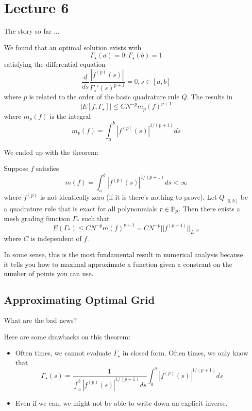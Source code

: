 \documentclass{article}
\begin{document}
\newpage
\section{Lecture 6}

The story so far ...


We found that an optimal solution exists with
\[\Gamma_\star(a) = 0; \Gamma_\star(b) = 1\]
satisfying the differential equation
\[\frac{d}{ds} \frac{|f^{(p)}(s)|}{\Gamma_\star'(s)^{p+1}} = 0, s \in [a, b]\]
where $p$ is related to the order of the basic quadrature rule $Q$. The results in
\[ | E[f, \Gamma_\star] | \leq C N^{-p} m_p(f)^{p+1}\]
where $m_p(f)$ is the integral
\[m_p(f) = \int_a^b |f^{(p)}(s)|^{1/(p+1)} ds\]

We ended up with the theorem:
\begin{theorem}
    Suppose $f$ satisfies
    \[m(f) = \int_a^b |f^{(p)}(s)|^{1/(p+1)} ds < \infty\]
    where $f^{(p)}$ is not identically zero (if it is there's nothing to prove). Let $Q_{[0, h]}$ be a quadrature rule that is exact for all polynonmials $r \in \mathbb{P}_p$. Then there exists a mesh grading function $\Gamma_*$ such that
    \[E(\Gamma_*) \leq C N^{-p} m(f)^{p+1} = C N^{-p} ||f^{(p+1)}||_{L^{1/p}}\]
    where $C$ is independent of $f$.
\end{theorem}

In some sense, this is the most fundamental result in numerical analysis because it tells you how to maximal approximate a function given a constrant on the number of points you can use.

\subsection{Approximating Optimal Grid}

\begin{question}
    What are the bad news?
\end{question}

Here are some drawbacks on this theorem:
\begin{itemize}
    \item Often times, we cannot evaluate $\Gamma_\star$ in closed form. Often times, we only know that
    \[\Gamma_\star(s) = \frac{1}{\int_a^b |f^{(p)}(s)|^{1/(p+1)} ds} \int_a^s |f^{(p)}(s)|^{1/(p+1)} ds \]
    \item Even if we can, we might not be able to write down an explicit inverse.
\end{itemize}
\end{document}
